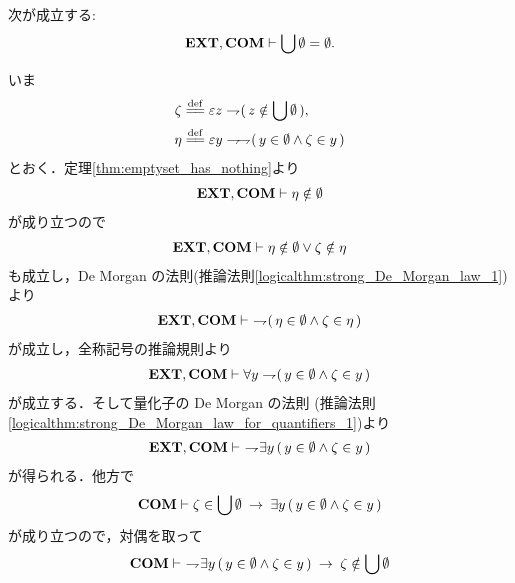 	\begin{screen}
		\begin{thm}[空集合の合併は空]\label{thm:the_union_of_the_emptyset_is_empty}
			次が成立する:
			\begin{align}
				\mbox{{\bf EXT}},\mbox{\bf COM} \vdash \bigcup \emptyset = \emptyset.
			\end{align}
		\end{thm}
	\end{screen}
	
	\begin{sketch}
		いま
		\begin{align}
			\zeta &\defeq \varepsilon z \negation (\, z \notin \bigcup \emptyset\, ), \\
			\eta &\defeq \varepsilon y \negation \negation (\, y \in \emptyset \wedge \zeta \in y\, )
		\end{align}
		とおく．定理\ref{thm:emptyset_has_nothing}より
		\begin{align}
			\mbox{{\bf EXT}},\mbox{\bf COM} \vdash \eta \notin \emptyset
		\end{align}
		が成り立つので
		\begin{align}
			\mbox{{\bf EXT}},\mbox{\bf COM} \vdash \eta \notin \emptyset \vee \zeta \notin \eta
		\end{align}
		も成立し，De Morgan の法則(推論法則\ref{logicalthm:strong_De_Morgan_law_1})より
		\begin{align}
			\mbox{{\bf EXT}},\mbox{\bf COM} \vdash\ \rightharpoondown\hspace{-0.25em} (\, \eta \in \emptyset \wedge \zeta \in \eta\, )
		\end{align}
		が成立し，全称記号の推論規則より
		\begin{align}
			\mbox{{\bf EXT}},\mbox{\bf COM} \vdash \forall y \rightharpoondown\hspace{-0.25em} (\, y \in \emptyset \wedge \zeta \in y\, )
		\end{align}
		が成立する．そして量化子の De Morgan の法則
		(推論法則\ref{logicalthm:strong_De_Morgan_law_for_quantifiers_1})より
		\begin{align}
			\mbox{{\bf EXT}},\mbox{\bf COM} \vdash\ \rightharpoondown\hspace{-0.25em} \exists y\, (\, y \in \emptyset \wedge \zeta \in y\, )
			\label{fom:the_union_of_the_emptyset_is_empty_1}
		\end{align}
		が得られる．他方で
		\begin{align}
			\mbox{\bf COM} \vdash \zeta \in \bigcup \emptyset
			\hspace{0.25em}\rightarrow\hspace{0.25em} \exists y\, (\, y \in \emptyset \wedge \zeta \in y\, )
		\end{align}
		が成り立つので，対偶を取って
		\begin{align}
			\COMAX \vdash\ 
			\negation \exists y\, (\, y \in \emptyset \wedge \zeta \in y\, )
			\rarrow \zeta \notin \bigcup \emptyset

\end{align}
\end{sketch}
